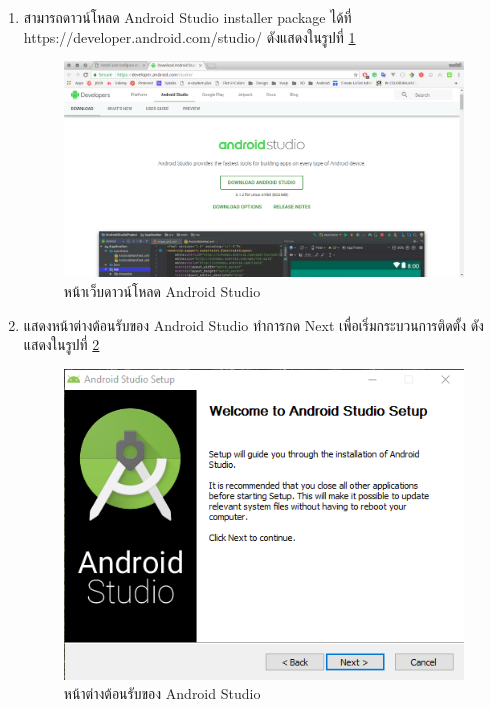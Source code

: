 \begin{enumerate}
	\item สามารถดาวน์โหลด Android Studio installer package ได้ที่ https://developer.android.com/studio/ ดังแสดงในรูปที่ \ref{Fig:android1}
	\begin{figure}[H]
		\includegraphics[width=\columnwidth]{Figures/prepareation/android1}
		\caption{หน้าเว็บดาวน์โหลด Android Studio}
		\label{Fig:android1}
	\end{figure}
	
	\item  แสดงหน้าต่างต้อนรับของ  Android Studio ทำการกด Next เพื่อเริ่มกระบวนการติดตั้ง ดังแสดงในรูปที่ \ref{Fig:android2}
	\begin{figure}[H]
		\centering
		\includegraphics[width=0.7\columnwidth]{Figures/prepareation/android2}
		\caption{หน้าต่างต้อนรับของ  Android Studio}
		\label{Fig:android2}
	\end{figure}
	

\end{enumerate}
